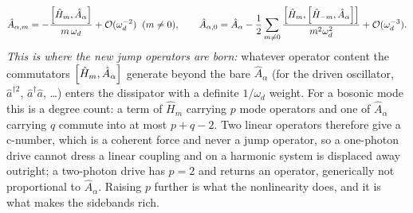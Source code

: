 \documentclass[a4paper,11pt]{article}
\begin{document}
\begin{equation}\label{eq:kickedAlow}
  \hat A_{\alpha,m} = -\frac{\comm{\hat H_m}{\hat A_\alpha}}{m\,\omega_d} + \mathcal O(\omega_d^{-2})
  \;\;(m\neq0),
  \qquad
  \hat A_{\alpha,0} = \hat A_\alpha
  - \frac12\sum_{m\neq0}\frac{\comm{\hat H_m}{\comm{\hat H_{-m}}{\hat A_\alpha}}}{m^2\omega_d^2}
  + \mathcal O(\omega_d^{-3}).
\end{equation}
\emph{
This is where the new jump operators are born:} whatever operator content the commutators $\comm{\hat H_m}{\hat A_\alpha}$ generate beyond the bare $\hat A_\alpha$ (for the driven oscillator, $\hat a^{\dagger2}$, $\hat a^\dagger\hat a$, \ldots) enters the dissipator with a definite $1/\omega_d$ weight. For a bosonic mode this is a degree count: a term of $\hat H_m$ carrying $p$ mode operators and one of $\hat A_\alpha$ carrying $q$ commute into at most $p+q-2$. Two linear operators therefore give a c-number, which is a coherent force and never a jump operator, so a one-photon drive cannot dress a linear coupling and on a harmonic system is displaced away outright; a two-photon drive has $p=2$ and returns an operator, generically not proportional to $\hat A_\alpha$. Raising $p$ further is what the nonlinearity does, and it is what makes the sidebands rich.
\end{document}
